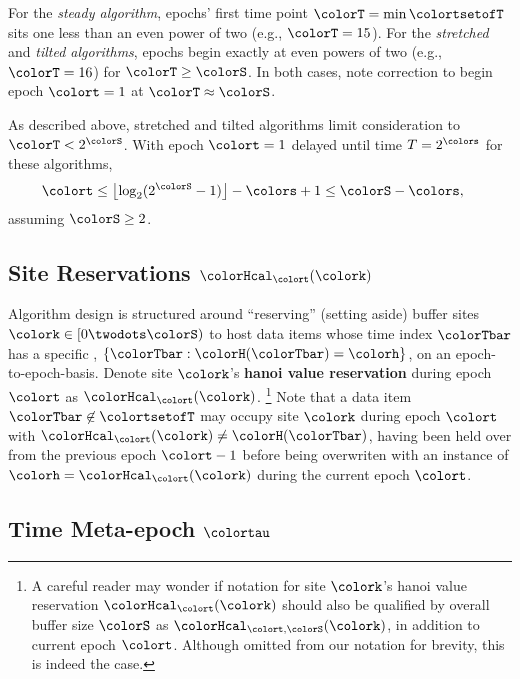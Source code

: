 For the \textit{steady algorithm}, epochs' first time point $\colorT = \min\colortsetofT$  sits one less than an even power of two (e.g.,  $\colorT = 15$).
For the \textit{stretched} and \textit{tilted algorithms}, epochs begin exactly at even powers of two (e.g., $\colorT = 16$) for $\colorT \geq \colorS$.
In both cases, note correction to begin epoch $\colort=1$ at $\colorT \approx \colorS$.

As described above, stretched and tilted algorithms limit consideration to $\colorT < 2^{\colorS}$.
With epoch $\colort = 1$ delayed until time $T=2^{\colors}$ for these algorithms,
\begin{align*}
\colort &\leq \left\lfloor\log_2(2^{\colorS} - 1)\right\rfloor - \colors + 1
\leq \colorS - \colors,
\end{align*}
assuming $\colorS \geq 2$.

\subsection{Site Reservations $\colorHcal_{\colort}(\colork)$}
\label{sec:notation-reservation}

Algorithm design is structured around ``reserving'' (setting aside) buffer sites $\colork \in [0 \twodots \colorS)$ to host data items whose time index $\colorTbar$ has a specific \hv{}, $\{\colorTbar : \colorH(\colorTbar) = \colorh \}$, on an epoch-to-epoch-basis.
Denote site $\colork$'s \textbf{hanoi value reservation} during epoch $\colort$ as $\colorHcal_{\colort}(\colork)$.%
\footnote{
A careful reader may wonder if notation for site $\colork$'s hanoi value reservation $\colorHcal_{\colort}(\colork)$ should also be qualified by overall buffer size $\colorS$ as $\colorHcal_{\colort,\colorS}(\colork)$, in addition to current epoch $\colort$.
Although omitted from our notation for brevity, this is indeed the case.
}
Note that a data item $\colorTbar \not\in \colortsetofT$ may occupy site $\colork$ during epoch $\colort$ with $\colorHcal_{\colort}(\colork) \neq \colorH(\colorTbar)$, having been held over from the previous epoch $\colort - 1$ before being overwriten with an instance of \hv{} $\colorh = \colorHcal_{\colort}(\colork)$ during the current epoch $\colort$.

\subsection{Time Meta-epoch $\colortau$}
\label{sec:notation-metaepoch}

